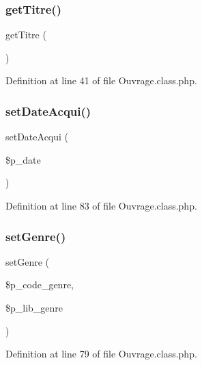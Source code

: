 \subsubsection{\texorpdfstring{get\+Titre()}{getTitre()}}
{\footnotesize\ttfamily get\+Titre (\begin{DoxyParamCaption}{ }\end{DoxyParamCaption})}



Definition at line 41 of file Ouvrage.\+class.\+php.

\mbox{\label{class_ouvrage_af1032ad1caa3a99b88439ff560154cbb}} 
\subsubsection{\texorpdfstring{set\+Date\+Acqui()}{setDateAcqui()}}
{\footnotesize\ttfamily set\+Date\+Acqui (\begin{DoxyParamCaption}\item[{}]{\$p\+\_\+date }\end{DoxyParamCaption})}



Definition at line 83 of file Ouvrage.\+class.\+php.

\mbox{\label{class_ouvrage_afc6aee0b5a4a6ccc98d6f0f46bac9f28}} 
\subsubsection{\texorpdfstring{set\+Genre()}{setGenre()}}
{\footnotesize\ttfamily set\+Genre (\begin{DoxyParamCaption}\item[{}]{\$p\+\_\+code\+\_\+genre,  }\item[{}]{\$p\+\_\+lib\+\_\+genre }\end{DoxyParamCaption})}



Definition at line 79 of file Ouvrage.\+class.\+php.

\mbox{\label{class_ouvrage_a47ab0d1e51132fff472aab5bcd9bec0f}} 
